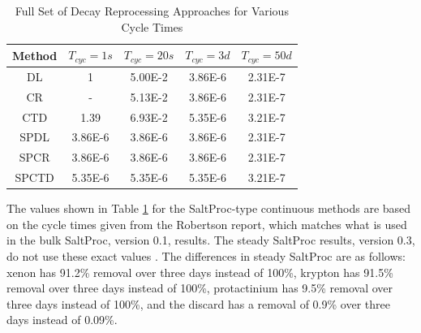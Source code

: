 \begin{table}[H]
\renewcommand{\arraystretch}{1.25}
\caption{Full Set of Decay Reprocessing Approaches for Various Cycle Times}
\label{tab:repr_decay_view_full}
\begin{center}
\begin{tabular}{ c | c | c | c | c }
 \hline
 Method & $T_{cyc} = 1 s$ & $T_{cyc} = 20 s$ & $T_{cyc} = 3 d$ & $T_{cyc} = 50 d$\\
 \hline
 \hline
 DL & 1 & 5.00E-2 & 3.86E-6 & 2.31E-7\\
 CR & - & 5.13E-2 & 3.86E-6 & 2.31E-7\\
 CTD & 1.39 & 6.93E-2 & 5.35E-6 & 3.21E-7\\
 \hline
 SPDL & 3.86E-6 & 3.86E-6 & 3.86E-6 & 2.31E-7\\
 SPCR & 3.86E-6 & 3.86E-6 & 3.86E-6 & 2.31E-7\\
 SPCTD & 5.35E-6 & 5.35E-6 & 5.35E-6 & 3.21E-7\\
 \hline
\end{tabular}
\end{center}
\end{table}

The values shown in Table \ref{tab:repr_decay_view_full} for the SaltProc-type continuous methods are based on the cycle times given from the Robertson report, which matches what is used in the bulk SaltProc, version 0.1, results. The steady SaltProc results, version 0.3, do not use these exact values \cite{robertson_conceptual_1971, rykhlevskii_advanced_2018}. The differences in steady SaltProc are as follows: xenon has 91.2\% removal over three days instead of 100\%, krypton has 91.5\% removal over three days instead of 100\%, protactinium has 9.5\% removal over three days instead of 100\%, and the discard has a removal of 0.9\% over three days instead of 0.09\%. %





